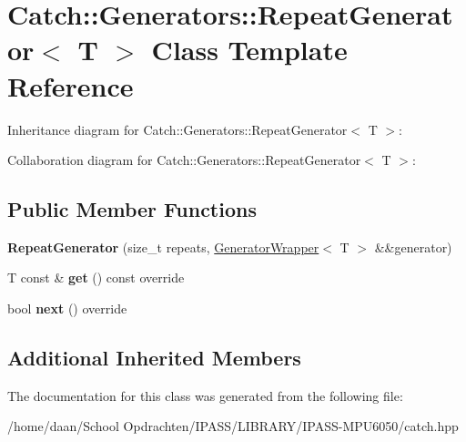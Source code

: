 \hypertarget{classCatch_1_1Generators_1_1RepeatGenerator}{}\section{Catch\+:\+:Generators\+:\+:Repeat\+Generator$<$ T $>$ Class Template Reference}
\label{classCatch_1_1Generators_1_1RepeatGenerator}


Inheritance diagram for Catch\+:\+:Generators\+:\+:Repeat\+Generator$<$ T $>$\+:


Collaboration diagram for Catch\+:\+:Generators\+:\+:Repeat\+Generator$<$ T $>$\+:
\subsection*{Public Member Functions}
\begin{DoxyCompactItemize}
\item 
\mbox{\label{classCatch_1_1Generators_1_1RepeatGenerator_a3aee12c4f9c2c04823ca3c75a20f234f}} 
{\bfseries Repeat\+Generator} (size\+\_\+t repeats, \hyperlink{classCatch_1_1Generators_1_1GeneratorWrapper}{Generator\+Wrapper}$<$ T $>$ \&\&generator)
\item 
\mbox{\label{classCatch_1_1Generators_1_1RepeatGenerator_a43bd573274c9a0cd7f4406a3d0d36d49}} 
T const  \& {\bfseries get} () const override
\item 
\mbox{\label{classCatch_1_1Generators_1_1RepeatGenerator_a24d5c2b1c09d6d220d4bd4c83f222dcb}} 
bool {\bfseries next} () override
\end{DoxyCompactItemize}
\subsection*{Additional Inherited Members}


The documentation for this class was generated from the following file\+:\begin{DoxyCompactItemize}
\item 
/home/daan/\+School Opdrachten/\+I\+P\+A\+S\+S/\+L\+I\+B\+R\+A\+R\+Y/\+I\+P\+A\+S\+S-\/\+M\+P\+U6050/catch.\+hpp\end{DoxyCompactItemize}
